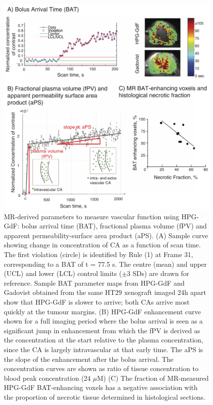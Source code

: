 \begin{figure}[htbp]
 \begin{center}
 \includegraphics[width=\textwidth]{hpg/hpg-paper1-images/hpg_fig2-bat.png}
 \caption{MR-derived parameters to measure vascular function using \ac{HPG-GdF}: bolus arrival time (BAT), fractional plasma volume (fPV) and apparent permeability-surface area product (aPS). (A) Sample curve showing change in concentration of \ac{CA} as a function of scan time. The first violation (circle) is identified by Rule (1) at Frame 31, corresponding to a BAT of t = 77.5 s. The centre (mean) and upper (UCL) and lower (LCL) control limits ($\pm$3 SDs) are drawn for reference. Sample BAT parameter maps from \ac{HPG-GdF} and Gadovist obtained from the same HT29 xenograft imaged 24h apart show that \ac{HPG-GdF} is slower to arrive; both \ac{CA}s arrive most quickly at the tumour margins. (B) \ac{HPG-GdF} enhancement curve shown for a full imaging period where the bolus arrival is seen as a significant jump in enhancement from which the \ac{fPV} is derived as the concentration at the start relative to the plasma concentration, since the \ac{CA} is largely intravascular at that early time. The \ac{aPS} is the slope of the enhancement after the bolus arrival. The concentration curves are shown as ratio of tissue concentration to blood peak concentration (24 $\mu$M) (C) The fraction of MR-measured \ac{HPG-GdF} BAT-enhancing voxels has a negative association with the proportion of necrotic tissue determined in histological sections.}
 \label{hpgpaper1:fig2}
 \end{center}
\end{figure}

